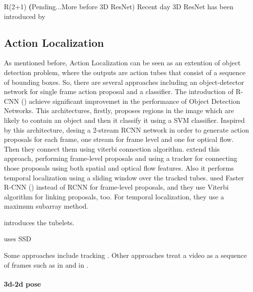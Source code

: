 \documentclass{report}
\begin{document}
R(2+1) \cite{DBLP:journals/corr/abs-1711-11248}
\textbf(Pending...More before 3D ResNet)
Recent day 3D ResNet has been introduced by \cite{Hara_2018_CVPR} 
\subsection{Action Localization}
As mentioned before, Action Localization can be seen as an extention of object detection problem, where the outputs are action tubes
that consist of a sequence of bounding boxes. So, there are several approaches including an object-detector network for single frame
action proposal and a classifier. The introduction of R-CNN (\cite{DBLP:journals/corr/GirshickDDM13}) achieve significant improvemet
in the performance of Object Detection Networks. This architectures, firstly, proposes regions in the image which are likely to
contain an object and then it classify it using a SVM classifier. Inspired by this architecture, \cite{DBLP:journals/corr/GkioxariM14}
desing a 2-stream RCNN network in order to generate action proposals for each frame, one stream for frame level and one for optical flow.
Then they  connect them using viterbi connection algorithm. \cite{DBLP:journals/corr/WeinzaepfelHS15} extend this approach, performing
frame-level proposals and using a tracker for connecting those proposals using both spatial and optical flow features. Also it performs
temporal localization using a sliding window over the tracked tubes. \cite{peng:hal-01349107} used Faster R-CNN (\cite{Ren:2015:FRT:2969239.2969250})
instead of RCNN for frame-level proposals, and they use Viterbi algorithm for linking proposals, too. For temporal localization, they
use a maximum subarray method.







\cite{6909495} introduces the tubelets.


\cite{singh2016online} uses SSD 

Some approaches include tracking \cite{DBLP:journals/corr/WeinzaepfelHS15}.
Other approaches treat a video as a sequence of frames such as in \cite{DBLP:journals/corr/KalogeitonWFS17} and in \cite{DBLP:journals/corr/HouCS17}.

\paragraph{3d-2d pose}
\end{document}
